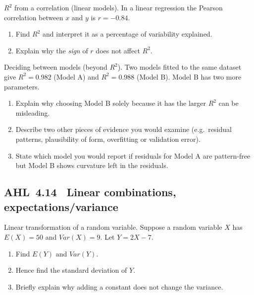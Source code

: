 \documentclass[11pt]{article}
\def\textbf#1{#1}%
\def\mathbb#1{#1}%
\def\mathrm#1{#1}%
\newcommand{\tocsubsection}[1]{\subsection{#1}}
\newcounter{question}
\begin{document}
\begin{question}
\textbf{$R^2$ from a correlation (linear models).}
In a linear regression the Pearson correlation between $x$ and $y$ is $r=-0.84$.
\begin{enumerate}
  \item Find $R^2$ and interpret it as a percentage of variability explained.
  \item Explain why the \emph{sign} of $r$ does not affect $R^2$.
\end{enumerate}
\end{question}

\begin{question}
\textbf{Deciding between models (beyond $R^2$).}
Two models fitted to the same dataset give $R^2=0.982$ (Model A) and $R^2=0.988$ (Model B). Model B has two more parameters.
\begin{enumerate}
  \item Explain why choosing Model B solely because it has the larger $R^2$ can be misleading.
  \item Describe two other pieces of evidence you would examine (e.g.\ residual patterns, plausibility of form, overfitting or validation error).
  \item State which model you would report if residuals for Model A are pattern‐free but Model B shows curvature left in the residuals.
\end{enumerate}
\end{question}



\tocsubsection{AHL 4.14 \; Linear combinations, expectations/variance}

\begin{question}
\textbf{Linear transformation of a random variable.}
Suppose a random variable $X$ has $\mathbb E(X)=50$ and $\mathrm{Var}(X)=9$.
Let $Y=2X-7$.
\begin{enumerate}
  \item Find $\mathbb E(Y)$ and $\mathrm{Var}(Y)$.
  \item Hence find the standard deviation of $Y$.
  \item Briefly explain why adding a constant does not change the variance.
\end{enumerate}
\end{question}
\end{document}
